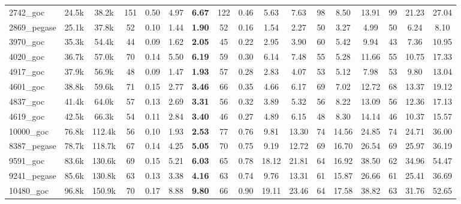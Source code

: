 \begin{tabular}{|l|c|c|cccc|cccc|ccc|ccc|}
2742\_goc 
&  24.5k
&  38.2k
& 151 
&  0.50
&  4.97
& \bf{ 6.67}
& 122 
&  0.46
&  5.63
&  7.63
& 98 
&  8.50
& 13.91
& 99 
& 21.23
& 27.04
\\

2869\_pegase 
&  25.1k
&  37.8k
& 52 
&  0.10
&  1.44
& \bf{ 1.90}
& 52 
&  0.16
&  1.54
&  2.27
& 50 
&  3.27
&  4.99
& 50 
&  6.24
&  8.10
\\
\hline
3970\_goc 
&  35.3k
&  54.4k
& 44 
&  0.09
&  1.62
& \bf{ 2.05}
& 45 
&  0.22
&  2.95
&  3.90
& 60 
&  5.42
&  9.94
& 43 
&  7.36
& 10.95
\\

4020\_goc 
&  36.7k
&  57.0k
& 70 
&  0.14
&  5.50
& \bf{ 6.19}
& 59 
&  0.30
&  6.14
&  7.48
& 55 
&  5.28
& 11.66
& 55 
& 10.75
& 17.33
\\

4917\_goc 
&  37.9k
&  56.9k
& 48 
&  0.09
&  1.47
& \bf{ 1.93}
& 57 
&  0.28
&  2.83
&  4.07
& 53 
&  5.12
&  7.98
& 53 
&  9.80
& 13.04
\\

4601\_goc 
&  38.8k
&  59.6k
& 71 
&  0.15
&  2.77
& \bf{ 3.46}
& 66 
&  0.35
&  4.66
&  6.17
& 69 
&  7.02
& 12.72
& 68 
& 13.37
& 19.12
\\

4837\_goc 
&  41.4k
&  64.0k
& 57 
&  0.13
&  2.69
& \bf{ 3.31}
& 56 
&  0.32
&  3.89
&  5.32
& 56 
&  8.22
& 13.09
& 56 
& 12.36
& 17.13
\\
\hline
4619\_goc 
&  42.5k
&  66.3k
& 54 
&  0.11
&  2.84
& \bf{ 3.40}
& 46 
&  0.27
&  4.89
&  6.15
& 48 
&  8.30
& 14.14
& 46 
& 10.37
& 15.57
\\

10000\_goc 
&  76.8k
& 112.4k
& 56 
&  0.10
&  1.93
& \bf{ 2.53}
& 77 
&  0.76
&  9.81
& 13.30
& 74 
& 14.56
& 24.85
& 74 
& 24.71
& 36.00
\\

8387\_pegase 
&  78.7k
& 118.7k
& 67 
&  0.14
&  4.25
& \bf{ 5.05}
& 70 
&  0.75
&  9.19
& 12.72
& 69 
& 16.70
& 26.54
& 69 
& 25.97
& 36.19
\\

9591\_goc 
&  83.6k
& 130.6k
& 69 
&  0.15
&  5.21
& \bf{ 6.03}
& 65 
&  0.78
& 18.12
& 21.81
& 64 
& 16.92
& 38.50
& 62 
& 34.96
& 54.47
\\

9241\_pegase 
&  85.6k
& 130.8k
& 63 
&  0.13
&  3.38
&  {\bf 4.16}
& 63 
&  0.74
&  9.76
& 13.31
& 61 
& 15.87
& 26.66
& 61 
& 25.41
& 36.69
\\
\hline
10480\_goc 
&  96.8k
& 150.9k
& 70 
&  0.17
&  8.88
&  {\bf 9.80}
& 66 
&  0.90
& 19.11
& 23.46
& 64 
& 17.58
& 38.82
& 63 
& 31.76
& 52.65
\\


\end{tabular}
